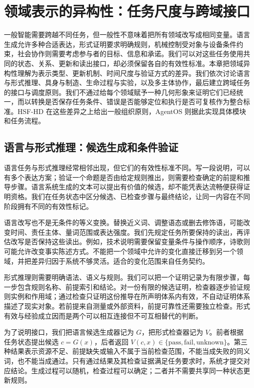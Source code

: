 \chapter{领域表示的异构性：任务尺度与跨域接口}
\label{chp:domain_manifolds_heterogeneity}

一般智能需要跨越不同任务，但一般性不意味着把所有领域改写成相同变量。语言生成允许多种合适表达，形式证明要求明确规则，机械控制受对象与设备条件约束，社会协作则需要考虑参与者的目标、信息和承诺。我们可以对这些任务使用共同的状态、关系、更新和读出接口，却必须保留各自的有效性标准。本章把领域异构性理解为表示类型、更新机制、时间尺度与验证方式的差异。我们依次讨论语言与形式推理、具身与制造、生命过程与实验，以及多主体协作，最后建立跨域任务的接口与调度原则。我们不通过给每个领域赋予一种几何形象来证明它们已经统一，而以转换是否保存任务条件、错误是否能够定位和执行是否可复核作为整合标准。HSF-HD 在这些差异之上给出一般组织原则，AgentOS 则据此实现具体模块和任务流程。

\section{语言与形式推理：候选生成和条件验证}
\label{sec:manifold_of_language}
\label{sec:manifold_of_logic}

语言任务与形式推理经常相邻出现，但它们的有效性标准不同。写一段说明，可以有多个表达方案；验证一个命题是否由给定规则推出，则需要检查确定的前提和推导步骤。语言系统生成的文本可以提出有价值的候选，却不能凭表达流畅便获得证明资格。我们在任务状态中区分候选、已检查步骤与最终结论，让同一内容在不同阶段拥有不同的有效性标记。

语言改写也不是无条件的等义变换。替换近义词、调整语态或删去修饰语，可能改变时间、责任主体、量词范围或表达强度。我们先规定任务所要保持的读出，再评估改写是否保持这些读出。例如，技术说明需要保留变量条件与操作顺序，诗歌则可能允许改变事实陈述方式。不能把一个领域中允许的变化直接迁移到另一个领域，并把差异归因于系统不够灵活。适合的变化范围来自任务契约。

形式推理则需要明确语法、语义与规则。我们可以把一个证明记录为有限步骤，每一步包含规则名称、前提索引和结论。对一份有限的候选证明，检查器逐步验证规则实例和作用域；通过检查只证明这份推导在所声明体系内有效，不自动证明体系描述了现实对象。若前提来自测量或外部资料，前提可靠性还需要独立检查。形式有效与经验成立因而是两个可以相互连接但不可互相替代的判断。

为了说明接口，我们把语言候选生成器记为 $G$，把形式检查器记为 $V$。前者根据任务状态提出候选 $c=G(x)$，后者返回 $V(c,x)\in\{\mathrm{pass},\mathrm{fail},\mathrm{unknown}\}$。第三种结果表示资源不足、前提缺失或输入不属于当前检查范围，不能当成失败的同义词，也不能当成通过。只有通过结果及其检查证据满足任务要求时，系统才提交对应结论。生成过程可以随机，检查过程可以确定；二者并不需要共享同一种状态更新规则。

